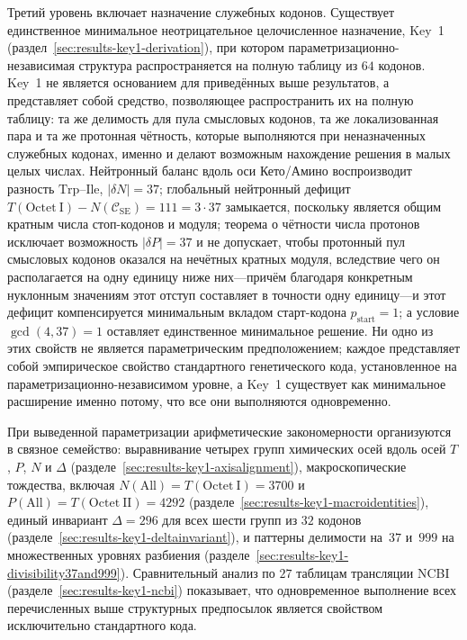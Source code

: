 \documentclass[11pt,a4paper]{article}
\renewcommand{\_}{\origunderscore\allowbreak}
\begin{document}
Третий уровень включает назначение служебных кодонов. Существует единственное минимальное неотрицательное целочисленное назначение, Key~1 (раздел~\ref{sec:results-key1-derivation}), при котором параметризационно-независимая структура распространяется на полную таблицу из $64$ кодонов. Key~1 не является основанием для приведённых выше результатов, а представляет собой средство, позволяющее распространить их на полную таблицу: та же делимость для пула смысловых кодонов, та же локализованная пара и та же протонная чётность, которые выполняются при неназначенных служебных кодонах, именно и делают возможным нахождение решения в малых целых числах. Нейтронный баланс вдоль оси Кето/Амино воспроизводит разность $\mathrm{Trp}$--$\mathrm{Ile}$, $|\delta N| = 37$; глобальный нейтронный дефицит $T(\mathrm{Octet~I}) - N(\mathcal{C}_{\mathrm{SE}}) = 111 = 3 \cdot 37$ замыкается, поскольку является общим кратным числа стоп-кодонов и модуля; теорема о чётности числа протонов исключает возможность $|\delta P| = 37$ и не допускает, чтобы протонный пул смысловых кодонов оказался на нечётных кратных модуля, вследствие чего он располагается на одну единицу ниже них---причём благодаря конкретным нуклонным значениям этот отступ составляет в точности одну единицу---и этот дефицит компенсируется минимальным вкладом старт-кодона $p_{\text{start}} = 1$; а условие $\gcd(4, 37) = 1$ оставляет единственное минимальное решение. Ни одно из этих свойств не является параметрическим предположением; каждое представляет собой эмпирическое свойство стандартного генетического кода, установленное на параметризационно-независимом уровне, а Key~1 существует как минимальное расширение именно потому, что все они выполняются одновременно.

При выведенной параметризации арифметические закономерности
организуются в связное семейство: выравнивание четырех
групп химических осей вдоль осей $T$, $P$, $N$ и $\Delta$
(разделе~\ref{sec:results-key1-axisalignment}),
макроскопические тождества, включая
$N(\mathrm{All}) = T(\mathrm{Octet~I}) = 3700$
и $P(\mathrm{All}) = T(\mathrm{Octet~II}) =
4292$
(разделе~\ref{sec:results-key1-macroidentities}),
единый инвариант $\Delta = 296$ для всех шести
групп из $32$ кодонов
(разделе~\ref{sec:results-key1-deltainvariant}), и
паттерны делимости на~$37$ и~$999$ на множественных
уровнях разбиения
(разделе~\ref{sec:results-key1-divisibility37and999}).
Сравнительный анализ по $27$ таблицам трансляции
NCBI (разделе~\ref{sec:results-key1-ncbi}) показывает,
что одновременное выполнение всех перечисленных выше
структурных предпосылок является свойством исключительно
стандартного кода.
\end{document}
